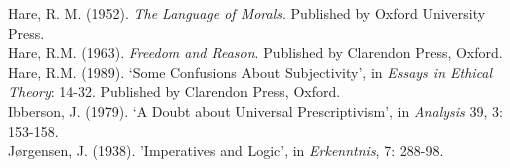 \documentclass[12pt]{article}
\begin{document}
\noindent
Hare, R. M. (1952). \textit{The Language of Morals}. Published by Oxford University Press.\\

\noindent
Hare, R.M. (1963). \textit{Freedom and Reason}. Published by Clarendon Press, Oxford.\\

\noindent
Hare, R.M. (1989). `Some Confusions About Subjectivity', in \textit{Essays in Ethical Theory}: 14-32. Published by Clarendon Press, Oxford.\\

\noindent
Ibberson, J. (1979). `A Doubt about Universal Prescriptivism', in \textit{Analysis} 39, 3: 153-158.\\

\noindent
Jørgensen, J. (1938). 'Imperatives and Logic', in \textit{Erkenntnis}, 7: 288-98.
\end{document}
